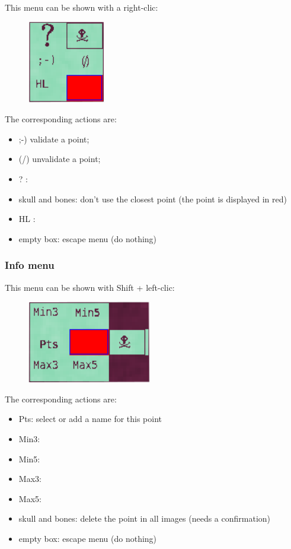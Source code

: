 This menu can be shown with a right-clic:

\begin{figure}[H]
\begin{center}
\includegraphics[width=95pt]{FIGS/Saisie/geometry.png}
\end{center}
\label{FIG:button1}
\end{figure}

The corresponding actions are:
\begin{itemize}
\item ;-) validate a point;
\item (/) unvalidate a point;
\item ? :
\item skull and bones: don't use the closest point (the point is displayed in red)
\item HL :
\item empty box: escape menu (do nothing)
\end{itemize}


\subsubsection{Info menu}

This menu can be shown with Shift + left-clic:

\begin{figure}[H]
\begin{center}
\includegraphics[width=154pt]{FIGS/Saisie/info.png}
\end{center}
\label{FIG:info}
\end{figure}

The corresponding actions are:
\begin{itemize}
\item Pts: select or add a name for this point
\item Min3:
\item Min5:
\item Max3:
\item Max5:
\item skull and bones: delete the point in all images (needs a confirmation)
\item empty box: escape menu (do nothing)
\end{itemize}

